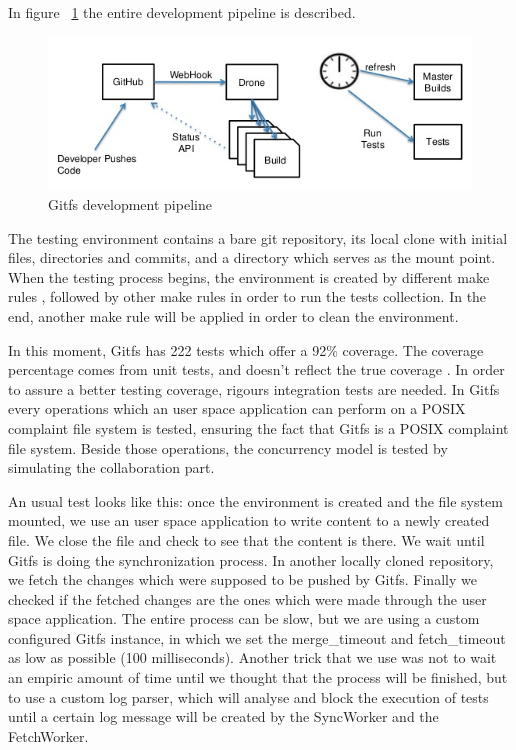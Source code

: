 In figure ~\ref{fig:pipeline} the entire development pipeline is described.

\begin{figure}[h]
  \begin{center}
    \includegraphics[width=16cm]{layout/drone.png}
  \end{center}
  \caption{Gitfs development pipeline \cite{GDR}}
  \label{fig:pipeline}
\end{figure}

The testing environment contains a bare git repository, its local clone with initial files, directories and commits, and a directory which serves as the mount point. When the testing process begins, the environment is created by different make rules \cite{Aham-cumming2015}, followed by other make rules in order to run the tests collection. In the end, another make rule will be applied in order to clean the environment.

In this moment, Gitfs has 222 tests which offer a 92\% coverage. The coverage percentage comes from unit tests, and doesn't reflect the true coverage \cite{Inozemtseva2014}. In order to assure a better testing coverage, rigours integration tests are needed. In Gitfs every operations which an user space application can perform on a POSIX complaint file system is tested, ensuring the fact that Gitfs is a POSIX complaint file system. Beside those operations, the concurrency model is tested by simulating the collaboration part.

An usual test looks like this: once the environment is created and the file system mounted, we use an user space application to write content to a newly created file. We close the file and check to see that the content is there. We wait until Gitfs is doing the synchronization process. In another locally cloned repository, we fetch the changes which were supposed to be pushed by Gitfs. Finally we checked if the fetched changes are the ones which were made through the user space application. The entire process can be slow, but we are using a custom configured Gitfs instance, in which we set the merge\_timeout and fetch\_timeout as low as possible (100 milliseconds). Another trick that we use was not to wait an empiric amount of time until we thought that the process will be finished, but to use a custom log parser, which will analyse and block the execution of tests until a certain log message will be created by the SyncWorker and the FetchWorker.

